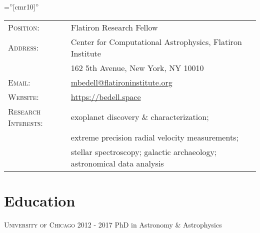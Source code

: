 \documentclass[letter,12pt]{article} %
\begin{document}

\pagestyle{empty} %

\font\fb=''[cmr10]'' %


\par{\bigskip\par} %




\begin{tabular}{ll}
\textsc{Position:} & Flatiron Research Fellow \\
\textsc{Address:} & Center for Computational Astrophysics, Flatiron Institute \\
  & 162 5th Avenue, New York, NY 10010 \\
\textsc{Email:} & \href{mailto:mbedell@flatironinstitute.org}{mbedell@flatironinstitute.org}\\
\textsc{Website:} & \href{https://bedell.space}{https://bedell.space} \\
\textsc{Research Interests:} & exoplanet discovery \& characterization; \\
 & extreme precision radial velocity measurements; \\
 & stellar spectroscopy; galactic archaeology; astronomical data analysis \\
\end{tabular}

\section{Education}
\textsc{University of Chicago}  \hfill 2012 - 2017
\newline PhD in Astronomy \& Astrophysics
\end{document}
